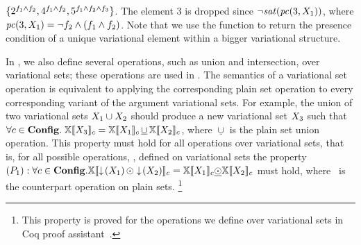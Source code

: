 $\{\annot [\A \wedge \B] 2,\annot [\A \wedge \B] 4,\annot [\A \wedge \B \wedge \C] 5\}$. The element $3$ is dropped 
since 
\ensuremath{\neg \sat {\getPCfrom 3 {\vset_1} }},
where
\ensuremath{
{\getPCfrom 3 {\vset_1} } = \neg \B \wedge (\A \wedge \B)}.
Note that we use the function \getPCfrom \elem {\annot \vset} to 
return the presence condition of a unique variational element within a bigger
variational structure. 

In , we also define several operations, such as union and
intersection, over variational sets; these operations are used in . The
semantics of a variational set operation is equivalent to applying the corresponding
plain set operation to every corresponding variant of the argument variational sets. For
example, the union of two variational sets $\vset_1\cup\vset_2$ should produce a new
variational set $\vset_3$ such that
%
$\forall c\in\confSet.\;
\osetSem{\vset_3} = \osetSem{\vset_1}\,\underline{\cup}\,\osetSem{\vset_2}$,
where $\underline{\cup}$ is the plain set union operation.
%
 This property must hold for all operations over variational sets, that is, for all possible operations, \vsetOp, defined on variational sets the property 
 \ensuremath{
 \Pone: 
 \forall \config \in \confSet. \osetSem {\pushIn {\vset_1} \vsetOp \pushIn {\vset_2}} 
 = \osetSem {\vset_1} \psetOp \osetSem {\vset_2}
 } must hold, where \psetOp\ is the counterpart operation on plain sets.%
\footnote{This property is proved for the operations we define over variational sets in Coq proof assistant~\cite{Khan21}.}

